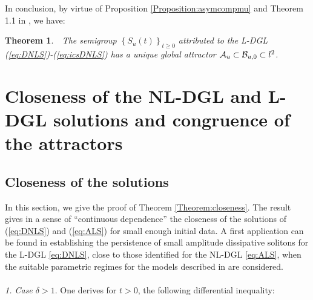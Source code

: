 \documentclass[preprintnumbers,amsmath,amssymb]{revtex4}
\newtheorem{theorem}{Theorem}[section]
\begin{document}
In conclusion, by virtue of  Proposition \ref{Proposition:asymcompmu} and Theorem 1.1 in \cite{Temam}, we have:

\begin{theorem}
{\it \,\,
The semigroup $\left\{S_u(t)\right\}_{t\ge 0}$ attributed to the L-DGL  (\ref{eq:DNLS})-(\ref{eq:icsDNLS}) has  a unique global attractor ${\cal A}_u\subset \mathcal{B}_{u,0}\subset l^2$.}\label{Theorem:attractorDNLS1}
\end{theorem}
%
\section{Closeness of the NL-DGL and L-DGL solutions and congruence of the attractors}\label{section:closeness}
\setcounter{equation}{0}
\subsection{Closeness of the solutions}
In this section, we give the proof of Theorem \ref{Theorem:closeness}. The result gives in a sense of  ``continuous dependence'' the closeness of the solutions of  (\ref{eq:DNLS}) and  (\ref{eq:ALS}) for small enough initial data. A first application can be found in establishing the persistence of small amplitude dissipative solitons for the L-DGL \eqref{eq:DNLS}, close to those identified for the NL-DGL \eqref{eq:ALS}, when the suitable parametric regimes for the models described in \cite{AGL3,AGL4,UGL6} are considered.
\\
\\
 \textit{1. Case $\delta>1$}. One derives for $t>0$, the following differential inequality:
\end{document}
